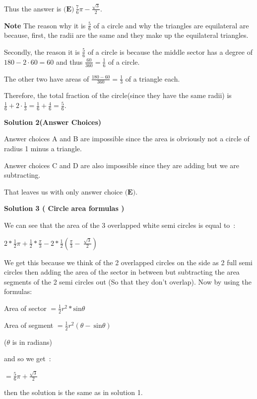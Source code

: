 \begin{enumerate}
 Thus the answer is $\boxed{\textbf{(E)}\ \frac{7}{6}\pi-\frac{\sqrt3}{2}}$.

 \textbf{Note} The reason why it is $\frac{5}{6}$ of a circle and why the triangles are equilateral are because, first, the radii are the same and they make up the equilateral triangles.

 Secondly, the reason it is $\frac{5}{6}$ of a circle is because the middle sector has a degree of $180-2 \cdot 60 = 60$ and thus $\frac{60}{360}=\frac{1}{6}$ of a circle.

 The other two have areas of $\frac{180-60}{360}=\frac{1}{3}$ of a triangle each.

 Therefore, the total fraction of the circle(since they have the same radii) is $\frac{1}{6} + 2 \cdot \frac{1}{3} = \frac{1}{6} + \frac{4}{6} = \frac{5}{6}.$




\textbf{Solution 2(Answer Choices)}

Answer choices A and B are impossible since the area is obviously not a circle of radius 1 minus a triangle.

 Answer choices C and D are also impossible since they are adding but we are subtracting.

 That leaves us with only answer choice $\textbf{(E)}.$




\textbf{Solution 3 ( Circle area formulas )}

We can see that the area of the $3$ overlapped white semi circles is equal to :

 $2*\frac{1}{2}\pi+\frac{1}{2}*\frac{\pi}{3}-2*\frac{1}{2}\left(\frac{\pi}{3} -\ \frac{\sqrt{3}}{2}\right)$

 We get this because we think of the 2 overlapped circles on the side as 2 full semi circles then adding the area of the sector in between but subtracting the area segments of the 2 semi circles out (So that they don't overlap). Now by using the formulas:

 Area of sector $=\frac{1}{2}r^2*\text{sin}\theta$

 Area of segment $=\frac{1}{2}r^2\left( \theta -\ \text{sin}\theta\right)$

 ($\theta$ is in radians)

 and so we get :

 $=\frac{5}{6}\pi+\frac{\sqrt3}{2}$

 then the solution is the same as in solution 1.

 



\end{enumerate}
